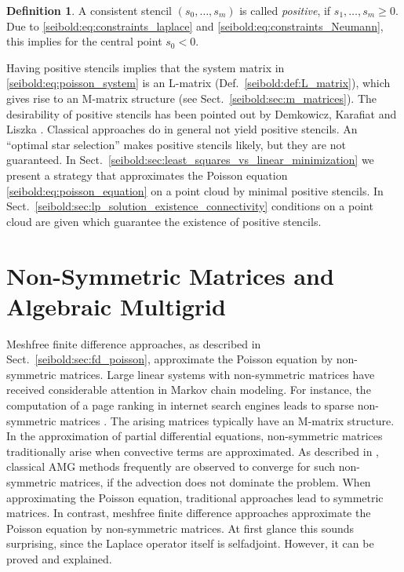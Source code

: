 \documentclass[reqno]{amsart}
\theoremstyle{plain}
\theoremstyle{definition}
\newtheorem{defn}{Definition}
\theoremstyle{remark}
\begin{document}
\begin{defn}
\label{seibold:def:positive_stencil}
A consistent stencil $(s_0,\dots,s_m)$ is called \emph{positive}, if \linebreak
$s_1,\dots,s_m\ge 0$. Due to \eqref{seibold:eq:constraints_laplace} and
\eqref{seibold:eq:constraints_Neumann}, this implies for the central point $s_0<0$.
\end{defn}
Having positive stencils implies that the system matrix
in \eqref{seibold:eq:poisson_system} is an L-matrix (Def.~\ref{seibold:def:L_matrix}),
which gives rise to an M-matrix structure (see Sect.~\ref{seibold:sec:m_matrices}).
The desirability of positive stencils has been pointed out
by Demkowicz, Karafiat and Liszka \cite{DemkowiczKarafiatLiszka1984}.
Classical approaches do in general not yield positive stencils.
An ``optimal star selection'' \cite{DuarteLiszkaTworzyako1996} makes positive stencils
likely, but they are not guaranteed.
In Sect.~\ref{seibold:sec:least_squares_vs_linear_minimization} we present a strategy
that approximates the Poisson equation \eqref{seibold:eq:poisson_equation} on a point
cloud by minimal positive stencils.
In Sect.~\ref{seibold:sec:lp_solution_existence_connectivity} conditions on a point
cloud are given which guarantee the existence of positive stencils.

\section{Non-Symmetric Matrices and Algebraic Multigrid}
\label{seibold:sec:non_symmetry_AMG}
Meshfree finite difference approaches, as described in Sect.~\ref{seibold:sec:fd_poisson},
approximate the Poisson equation by non-symmetric matrices.
Large linear systems with non-symmetric matrices have received considerable attention
in Markov chain modeling. For instance, the computation of a page ranking in internet
search engines leads to sparse non-symmetric matrices \cite{LangvilleMeyer2006}.
The arising matrices typically have an M-matrix structure.
In the approximation of partial differential equations, non-symmetric matrices
traditionally arise when convective terms are approximated.
As described in \cite{TrottenbergOosterleeSchuller2001}, classical AMG methods
frequently are observed to converge for such non-symmetric matrices, if the advection
does not dominate the problem. When approximating the Poisson equation, traditional
approaches lead to symmetric matrices. In contrast, meshfree finite difference approaches
approximate the Poisson equation by non-symmetric matrices. At first glance this
sounds surprising, since the Laplace operator itself is selfadjoint. However, it can
be proved and explained.
\end{document}
